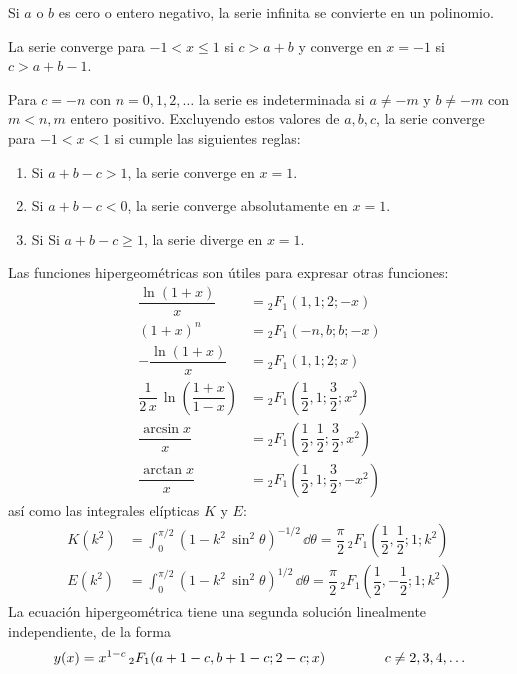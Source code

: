 \par
Si $a$ o $b$ es cero o entero negativo, la serie infinita se convierte en un polinomio.
\par
La serie converge para $-1 < x \leq 1$ si $c > a + b$ y converge en $x = -1$ si $c > a + b - 1$.
\par
Para $c = -n$ con $n = 0, 1, 2, \ldots$ la serie es indeterminada si $a \neq -m$ y $b \neq -m$ con $m < n, m$ entero positivo. Excluyendo estos valores de $a, b, c$, la serie converge para $-1 < x < 1$ si cumple las siguientes reglas:
\begin{enumerate}[label=\alph*)]
\item Si $a + b - c > 1$, la serie converge en $x = 1$.
\item Si $a + b - c < 0$, la serie converge absolutamente en $x = 1$.
\item Si Si $a + b - c \geq 1$, la serie diverge en $x = 1$.
\end{enumerate}
Las funciones hipergeométricas son útiles para expresar otras funciones:
\begin{align*}
\dfrac{\ln (1 + x)}{x} &= {}_{2} F_{1}(1, 1; 2; -x) \\[1em]
(1 + x)^{n} &= {}_{2} F_{1}(-n, b; b; -x) \\[1em]
- \dfrac{\ln (1 + x)}{x} &= {}_{2} F_{1}(1, 1; 2; x) \\[1em]
\dfrac{1}{2 \, x} \, \ln \left( \dfrac{1 + x}{1 - x} \right)&= {}_{2} F_{1}\left( \dfrac{1}{2}, 1; \dfrac{3}{2}; x^{2} \right) \\[1em]
\dfrac{\arcsin x}{x} &= {}_{2} F_{1} \left( \dfrac{1}{2}, \dfrac{1}{2}; \dfrac{3}{2}, x^{2} \right) \\[1em]
\dfrac{\arctan x}{x} &= {}_{2} F_{1} \left( \dfrac{1}{2}, 1; \dfrac{3}{2}, -x^{2} \right)
\end{align*}
así como las integrales elípticas $K$ y $E$:
\begin{align*}
K(k^{2}) &=\int_{0}^{\pi/2} (1 - k^{2} \, \sin^{2} \theta)^{-1/2} \, \dd \theta = \dfrac{\pi}{2} \, {}_{2} F_{1} \left( \dfrac{1}{2}, \dfrac{1}{2}; 1; k^{2}  \right) \\[1em]
E(k^{2})  &= \int_{0}^{\pi/2} (1 - k^{2} \, \sin^{2} \theta)^{1/2} \, \dd \theta = \dfrac{\pi}{2} \, {}_{2} F_{1} \left( \dfrac{1}{2}, -\dfrac{1}{2}; 1; k^{2}  \right)
\end{align*}
La ecuación hipergeométrica tiene una segunda solución linealmente independiente, de la forma
\begin{align*}
y(x) = x^{1-c} \, {}_{2} F_{1} (a+1-c, b+1-c; 2-c; x) \hspace{1.5cm} c \neq 2, 3, 4, \ldots
\end{align*}

